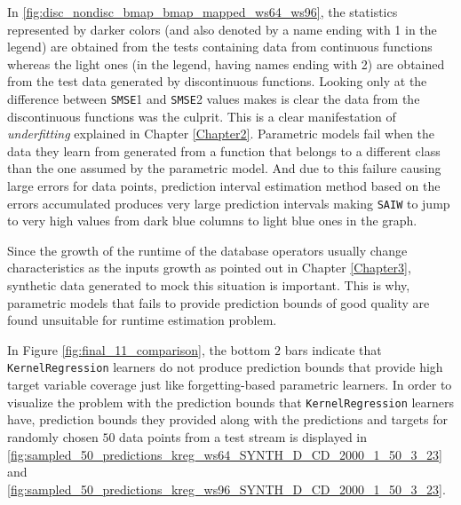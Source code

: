 In \ref{fig:disc_nondisc_bmap_bmap_mapped_ws64_ws96}, the statistics represented by darker colors (and also denoted by a name ending with 1 in the legend) are obtained from the tests containing data from continuous functions whereas the light ones (in the legend, having names ending with 2) are obtained from the test data generated by discontinuous functions. Looking only at the difference between \texttt{SMSE}1 and \texttt{SMSE}2 values makes is clear the data from the discontinuous functions was the culprit. This is a clear manifestation of \textit{underfitting} explained in Chapter \ref{Chapter2}. Parametric models fail when the data they learn from generated from a function that belongs to a different class than the one assumed by the parametric model. And due to this failure causing large errors for data points, prediction interval estimation method based on the errors accumulated produces very large prediction intervals making \texttt{SAIW} to jump to very high values from dark blue columns to light blue ones in the graph. 

Since the growth of the runtime of the database operators usually change characteristics as the inputs growth as pointed out in Chapter \ref{Chapter3}, synthetic data generated to mock this situation is important. This is why, parametric models that fails to provide prediction bounds of good quality are found unsuitable for runtime estimation problem. 

In Figure \ref{fig:final_11_comparison}, the bottom $2$ bars indicate that \texttt{KernelRegression} learners do not produce prediction bounds that provide high target variable coverage just like forgetting-based parametric learners. In order to visualize the problem with the prediction bounds that \texttt{KernelRegression} learners have, prediction bounds they provided along with the predictions and targets for randomly chosen $50$ data points from a test stream is displayed in \ref{fig:sampled_50_predictions_kreg_ws64_SYNTH_D_CD_2000_1_50_3_23} and \ref{fig:sampled_50_predictions_kreg_ws96_SYNTH_D_CD_2000_1_50_3_23}. 

